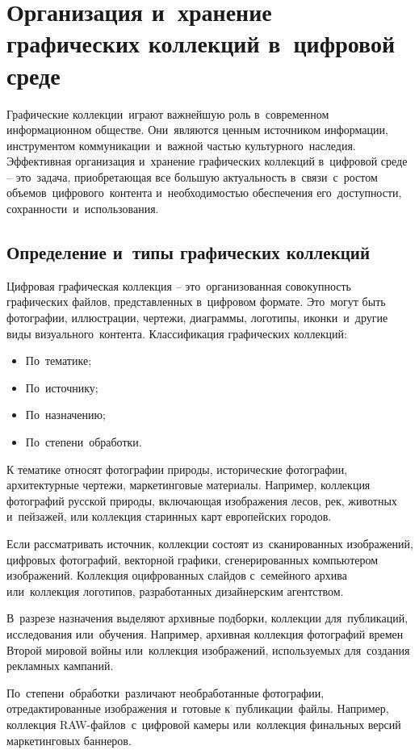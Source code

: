 \documentclass{ou}
\begin{document}
\section{Организация и~хранение графических коллекций в~цифровой среде}
Графические коллекции~играют важнейшую роль в~современном информационном обществе. Они~являются ценным источником информации, инструментом коммуникации~и~важной частью культурного~наследия. Эффективная организация и~хранение графических коллекций в~цифровой среде -- это~задача, приобретающая все большую актуальность в~связи~с~ростом объемов~цифрового~контента и~необходимостью обеспечения его~доступности, сохранности~и~использования.
\subsection{Определение и~типы графических коллекций}
Цифровая графическая коллекция -- это~организованная совокупность графических файлов, представленных в~цифровом формате. Это~могут быть фотографии, иллюстрации, чертежи, диаграммы, логотипы, иконки~и~другие виды визуального~контента.
Классификация графических коллекций:
\begin{itemize}[label=-, itemindent=2em, nosep]
\item По~тематике;
\item По~источнику;
\item По~назначению;
\item По~степени~обработки.
\end{itemize}
К тематике относят фотографии природы, исторические фотографии, архитектурные чертежи, маркетинговые материалы. Например, коллекция фотографий русской природы, включающая изображения лесов, рек, животных и~пейзажей, или коллекция старинных карт европейских городов.

Если рассматривать источник, коллекции состоят из~сканированных изображений, цифровых фотографий, векторной графики, сгенерированных компьютером изображений. Коллекция оцифрованных слайдов с~семейного архива или~коллекция логотипов, разработанных дизайнерским агентством.

В~разрезе назначения выделяют архивные подборки, коллекции для~публикаций, исследования или~обучения. Например, архивная коллекция фотографий времен Второй мировой войны или~коллекция изображений, используемых для~создания рекламных кампаний.

По~степени~обработки~различают необработанные фотографии, отредактированные изображения и~готовые к~публикации~файлы. Например, коллекция RAW-файлов~с~цифровой камеры или~коллекция финальных версий маркетинговых баннеров.
\end{document}
